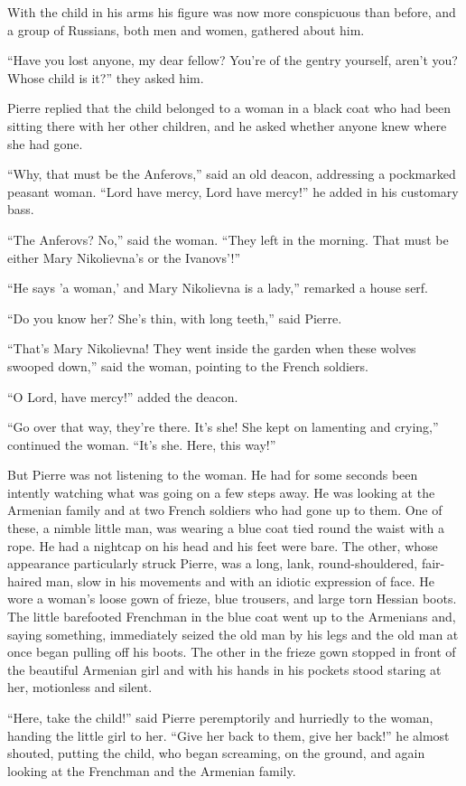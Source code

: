 With the child in his arms his figure was now more conspicuous
than before, and a group of Russians, both men and women,
gathered about him.

``Have you lost anyone, my dear fellow? You're of the gentry
yourself, aren't you? Whose child is it?'' they asked him.

Pierre replied that the child belonged to a woman in a black coat
who had been sitting there with her other children, and he asked
whether anyone knew where she had gone.

``Why, that must be the Anferovs,'' said an old deacon,
addressing a pockmarked peasant woman. ``Lord have mercy, Lord
have mercy!'' he added in his customary bass.

``The Anferovs? No,'' said the woman. ``They left in the
morning. That must be either Mary Nikolievna's or the Ivanovs'!''

``He says 'a woman,' and Mary Nikolievna is a lady,'' remarked a
house serf.

``Do you know her? She's thin, with long teeth,'' said Pierre.

``That's Mary Nikolievna! They went inside the garden when these
wolves swooped down,'' said the woman, pointing to the French
soldiers.

``O Lord, have mercy!'' added the deacon.

``Go over that way, they're there. It's she! She kept on
lamenting and crying,'' continued the woman. ``It's she. Here,
this way!''

But Pierre was not listening to the woman. He had for some
seconds been intently watching what was going on a few steps
away. He was looking at the Armenian family and at two French
soldiers who had gone up to them.  One of these, a nimble little
man, was wearing a blue coat tied round the waist with a rope. He
had a nightcap on his head and his feet were bare. The other,
whose appearance particularly struck Pierre, was a long, lank,
round-shouldered, fair-haired man, slow in his movements and with
an idiotic expression of face. He wore a woman's loose gown of
frieze, blue trousers, and large torn Hessian boots. The little
barefooted Frenchman in the blue coat went up to the Armenians
and, saying something, immediately seized the old man by his legs
and the old man at once began pulling off his boots. The other in
the frieze gown stopped in front of the beautiful Armenian girl
and with his hands in his pockets stood staring at her,
motionless and silent.

``Here, take the child!'' said Pierre peremptorily and hurriedly
to the woman, handing the little girl to her. ``Give her back to
them, give her back!'' he almost shouted, putting the child, who
began screaming, on the ground, and again looking at the
Frenchman and the Armenian family.


